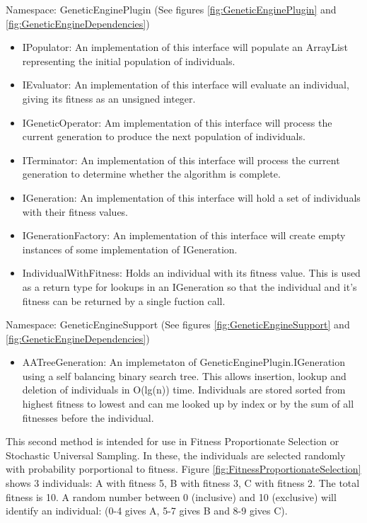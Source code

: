 Namespace: GeneticEnginePlugin (See figures \ref{fig:GeneticEnginePlugin} and \ref{fig:GeneticEngineDependencies})
\begin{itemize}
\item IPopulator: An implementation of this interface will populate an ArrayList representing the initial population of individuals.
\item IEvaluator: An implementation of this interface will evaluate an individual, giving its fitness as an unsigned integer.
\item IGeneticOperator: Am implementation of this interface will process the current generation to produce the next population of individuals.
\item ITerminator: An implementation of this interface will  process the current generation to determine whether the algorithm is complete.
\item IGeneration: An implementation of this interface will hold a set of individuals with their fitness values.
\item IGenerationFactory: An implementation of this interface will create empty instances of some implementation of IGeneration.
\item IndividualWithFitness: Holds an individual with its fitness value. This is used as a return type for lookups in an IGeneration so that the individual and it's fitness can be returned by a single fuction call.
\end{itemize}

Namespace: GeneticEngineSupport (See figures \ref{fig:GeneticEngineSupport} and \ref{fig:GeneticEngineDependencies})
\begin{itemize}
\item AATreeGeneration: An implemetaton of GeneticEnginePlugin.IGeneration using a self balancing binary search tree. This allows insertion, lookup and deletion of individuals in O(lg(n)) time. Individuals are stored sorted from highest fitness to lowest and can me looked up by index or by the sum of all fitnesses before the individual. 
\end{itemize}

This second method is intended for use in Fitness Proportionate Selection or Stochastic Universal Sampling. In these, the individuals are selected randomly with probability porportional to fitness. Figure \ref{fig:FitnessProportionateSelection} shows 3 individuals: A with fitness 5, B with fitness 3, C with fitness 2. The total fitness is 10. A random number between 0 (inclusive) and 10 (exclusive) will identify an individual: (0-4 gives A, 5-7 gives B and 8-9 gives C).

